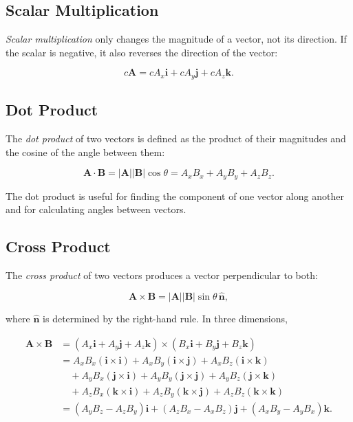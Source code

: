 \documentclass[../main.tex]{subfiles}
\begin{document}
\subsection{Scalar Multiplication}

\emph{Scalar multiplication} only changes the magnitude of a vector, not its direction. If the scalar is negative, it also reverses the direction of the vector:

\[
c\mathbf{A} = cA_x\mathbf{i} + cA_y\mathbf{j} + cA_z\mathbf{k}.
\]



\subsection{Dot Product}

The \emph{dot product} of two vectors is defined as the product of their magnitudes and the cosine of the angle between them:

\[\mathbf{A}\cdot\mathbf{B} = |\mathbf{A}||\mathbf{B}|\cos\theta = A_xB_x + A_yB_y + A_zB_z.\]

The dot product is useful for finding the component of one vector along another and for calculating angles between vectors.



\subsection{Cross Product}


The \emph{cross product} of two vectors produces a vector perpendicular to both:

\[
\mathbf{A}\times\mathbf{B}
= |\mathbf{A}||\mathbf{B}|\sin\theta\,\hat{\mathbf{n}},
\]

where $\hat{\mathbf{n}}$ is determined by the right-hand rule. In three dimensions,

\begin{align*}
\mathbf{A}\times\mathbf{B}
&= (A_x\mathbf{i} + A_y\mathbf{j} + A_z\mathbf{k}) \times (B_x\mathbf{i} + B_y\mathbf{j} + B_z\mathbf{k})\\
&= A_xB_x(\mathbf{i}\times\mathbf{i}) + A_xB_y(\mathbf{i}\times\mathbf{j}) + A_xB_z(\mathbf{i}\times\mathbf{k}) \\
&\quad + A_yB_x(\mathbf{j}\times\mathbf{i}) + A_yB_y(\mathbf{j}\times\mathbf{j}) + A_yB_z(\mathbf{j}\times\mathbf{k}) \\
&\quad + A_zB_x(\mathbf{k}\times\mathbf{i}) + A_zB_y(\mathbf{k}\times\mathbf{j}) + A_zB_z(\mathbf{k}\times\mathbf{k}) \\
&= (A_yB_z - A_zB_y)\mathbf{i} + (A_zB_x - A_xB_z)\mathbf{j} + (A_xB_y - A_yB_x)\mathbf{k}.  
\end{align*}
\end{document}
